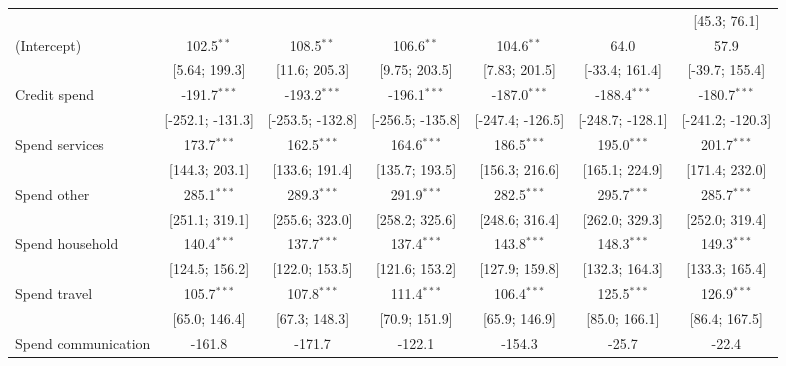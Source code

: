\begin{table}[htbp]
\begin{threeparttable}[b]
\begin{tabular}{lcccccc}
                                   &                  &                  &                  &                  &                  & [45.3; 76.1]\\   
         (Intercept)               & 102.5$^{**}$     & 108.5$^{**}$     & 106.6$^{**}$     & 104.6$^{**}$     & 64.0             & 57.9\\   
                                   & [5.64; 199.3]    & [11.6; 205.3]    & [9.75; 203.5]    & [7.83; 201.5]    & [-33.4; 161.4]   & [-39.7; 155.4]\\   
         Credit spend              & -191.7$^{***}$   & -193.2$^{***}$   & -196.1$^{***}$   & -187.0$^{***}$   & -188.4$^{***}$   & -180.7$^{***}$\\   
                                   & [-252.1; -131.3] & [-253.5; -132.8] & [-256.5; -135.8] & [-247.4; -126.5] & [-248.7; -128.1] & [-241.2; -120.3]\\   
         Spend services            & 173.7$^{***}$    & 162.5$^{***}$    & 164.6$^{***}$    & 186.5$^{***}$    & 195.0$^{***}$    & 201.7$^{***}$\\   
                                   & [144.3; 203.1]   & [133.6; 191.4]   & [135.7; 193.5]   & [156.3; 216.6]   & [165.1; 224.9]   & [171.4; 232.0]\\   
         Spend other               & 285.1$^{***}$    & 289.3$^{***}$    & 291.9$^{***}$    & 282.5$^{***}$    & 295.7$^{***}$    & 285.7$^{***}$\\   
                                   & [251.1; 319.1]   & [255.6; 323.0]   & [258.2; 325.6]   & [248.6; 316.4]   & [262.0; 329.3]   & [252.0; 319.4]\\   
         Spend household           & 140.4$^{***}$    & 137.7$^{***}$    & 137.4$^{***}$    & 143.8$^{***}$    & 148.3$^{***}$    & 149.3$^{***}$\\   
                                   & [124.5; 156.2]   & [122.0; 153.5]   & [121.6; 153.2]   & [127.9; 159.8]   & [132.3; 164.3]   & [133.3; 165.4]\\   
         Spend travel              & 105.7$^{***}$    & 107.8$^{***}$    & 111.4$^{***}$    & 106.4$^{***}$    & 125.5$^{***}$    & 126.9$^{***}$\\   
                                   & [65.0; 146.4]    & [67.3; 148.3]    & [70.9; 151.9]    & [65.9; 146.9]    & [85.0; 166.1]    & [86.4; 167.5]\\   
         Spend communication       & -161.8           & -171.7           & -122.1           & -154.3           & -25.7            & -22.4\\   

\end{tabular}
\end{threeparttable}
\end{table}
